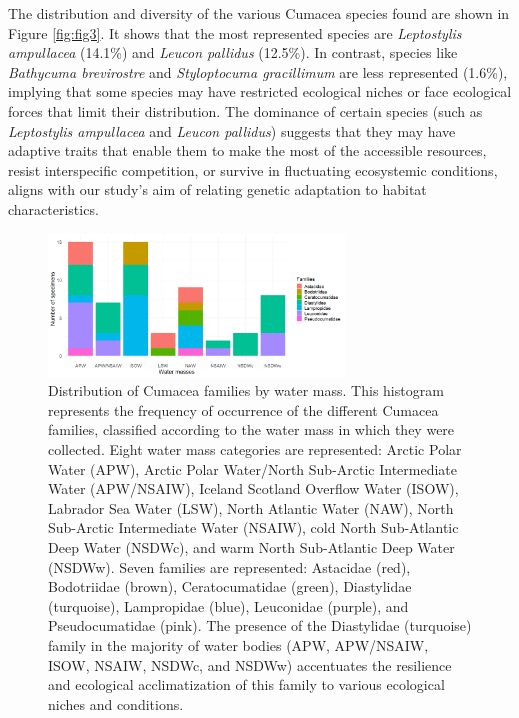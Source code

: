 {The distribution and diversity of the various Cumacea species found are shown in Figure \ref{fig:fig3}. It shows that the most represented species are \emph{Leptostylis ampullacea} (14.1\%) and \emph{Leucon pallidus} (12.5\%). In contrast, species like \emph{Bathycuma brevirostre} and \emph{Styloptocuma gracillimum} are less represented (1.6\%), implying that some species may have restricted ecological niches or face ecological forces that limit their distribution. The dominance of certain species (such as \emph{Leptostylis ampullacea} and \emph{Leucon pallidus}) suggests that they may have adaptive traits that enable them to make the most of the accessible resources, resist interspecific competition, or survive in fluctuating ecosystemic conditions, aligns with our study’s aim of relating genetic adaptation to habitat characteristics.

\begin{figure}[htbp]
    \centering
    \includegraphics[width=0.7\textwidth]{figure3.png}
    \caption{Distribution of Cumacea families by water mass. This histogram represents the frequency of occurrence of the different Cumacea families, classified according to the water mass in which they were collected. Eight water mass categories are represented: Arctic Polar Water (APW), Arctic Polar Water/North Sub-Arctic Intermediate Water (APW/NSAIW), Iceland Scotland Overflow Water (ISOW), Labrador Sea Water (LSW), North Atlantic Water (NAW), North Sub-Arctic Intermediate Water (NSAIW), cold North Sub-Atlantic Deep Water (NSDWc), and warm North Sub-Atlantic Deep Water (NSDWw). Seven families are represented: Astacidae (red), Bodotriidae (brown), Ceratocumatidae (green), Diastylidae (turquoise), Lampropidae (blue), Leuconidae (purple), and Pseudocumatidae (pink). The presence of the Diastylidae (turquoise) family in the majority of water bodies (APW, APW/NSAIW, ISOW, NSAIW, NSDWc, and NSDWw) accentuates the resilience and ecological acclimatization of this family to various ecological niches and conditions. \label{fig:fig4}}
\end{figure}

}
